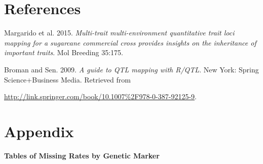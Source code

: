 \documentclass[11pt]{article}\usepackage[]{graphicx}\usepackage[]{color}
\begin{document}
\newpage
\section*{References}
\setlength{\parindent}{-0.2in}
\setlength{\leftskip}{0.2in}
\setlength{\parskip}{3pt}
\noindent

Margarido et al. 2015. {\it Multi-trait multi-environment quantitative trait loci mapping for a sugarcane commercial cross provides insights on the inheritance of important traits}. Mol Breeding 35:175.

Broman and Sen. 2009. {\it A guide to QTL mapping with R/QTL}. New York: Spring Science+Business Media. Retrieved from 

\url{http://link.springer.com/book/10.1007%2F978-0-387-92125-9}.

\setlength{\parindent}{0in}
\setlength{\leftskip}{0in}
\setlength{\parskip}{8pt}

\newpage


\section*{Appendix}
{\bf Tables of Missing Rates by Genetic Marker}
\end{document}
